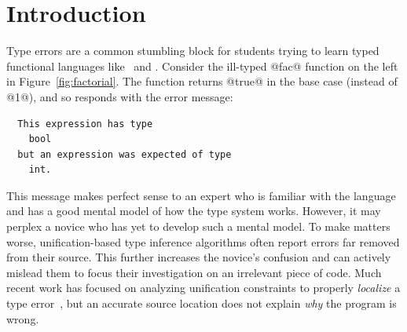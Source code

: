 \section{Introduction}
\label{sec:introduction}

Type errors are a common stumbling block for students
trying to learn typed functional languages like \ocaml\
and \haskell.
%
Consider the ill-typed @fac@ function on the left in
Figure~\ref{fig:factorial}.
%
The function returns @true@ in the base case (instead of @1@),
and so \ocaml responds with the error message:
%
\begin{verbatim}
  This expression has type
    bool
  but an expression was expected of type
    int.
\end{verbatim}
%
This message makes perfect sense to an expert who is familiar
with the language and has a good mental model of how the type
system works.
%
However, it may perplex a novice who has yet to develop such a
mental model.
%
To make matters worse, unification-based type inference algorithms
often report errors far removed from their source.
%
This further increases the novice's confusion and can actively mislead
them to focus their investigation on an irrelevant piece of code.
%
Much recent work has focused on analyzing unification constraints
to properly \emph{localize} a type error~\cite{Lerner2007-dt,Chen2014-gd,Zhang2014-lv,Pavlinovic2014-mr},
but an accurate source location does not explain \emph{why} the
program is wrong.


